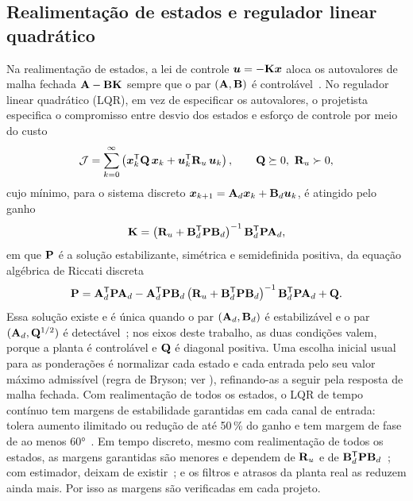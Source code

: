 \subsection{Realimentação de estados e regulador linear quadrático}

Na realimentação de estados, a lei de controle $\bm{u} = -\mathbf{K}\bm{x}$
aloca os autovalores de malha fechada $\mathbf{A} - \mathbf{B}\mathbf{K}$
sempre que o par $(\mathbf{A}, \mathbf{B})$ é
controlável~\cite{ogata2010,fadali2009}.
No regulador linear quadrático (LQR), em vez de especificar os autovalores, o
projetista especifica o compromisso entre desvio dos estados e esforço de
controle por meio do custo
\begin{equation}
\mathcal{J} = \sum_{k=0}^{\infty}
\left(\bm{x}_k^{\mathsf{T}}\mathbf{Q}\,\bm{x}_k
    + \bm{u}_k^{\mathsf{T}}\mathbf{R}_u\,\bm{u}_k\right),
\qquad \mathbf{Q} \succeq 0,\ \mathbf{R}_u \succ 0,
\label{eq:custo-lqr}
\end{equation}
cujo mínimo, para o sistema discreto
$\bm{x}_{k+1} = \mathbf{A}_d\bm{x}_k + \mathbf{B}_d\bm{u}_k$, é
atingido pelo ganho~\cite{franklin1998,datta2003}
\begin{equation}
\mathbf{K} = \left(\mathbf{R}_u + \mathbf{B}_d^{\mathsf{T}}\mathbf{P}\mathbf{B}_d\right)^{-1}
             \mathbf{B}_d^{\mathsf{T}}\mathbf{P}\mathbf{A}_d,
\label{eq:ganho-lqr}
\end{equation}
em que $\mathbf{P}$ é a solução estabilizante, simétrica e semidefinida
positiva, da equação algébrica de Riccati discreta
\begin{equation}
\mathbf{P} = \mathbf{A}_d^{\mathsf{T}}\mathbf{P}\mathbf{A}_d
 - \mathbf{A}_d^{\mathsf{T}}\mathbf{P}\mathbf{B}_d
   \left(\mathbf{R}_u + \mathbf{B}_d^{\mathsf{T}}\mathbf{P}\mathbf{B}_d\right)^{-1}
   \mathbf{B}_d^{\mathsf{T}}\mathbf{P}\mathbf{A}_d + \mathbf{Q}.
\label{eq:riccati}
\end{equation}
Essa solução existe e é única quando o par $(\mathbf{A}_d, \mathbf{B}_d)$ é
estabilizável e o par $(\mathbf{A}_d, \mathbf{Q}^{1/2})$ é
detectável~\cite{datta2003}; nos eixos deste trabalho, as duas condições
valem, porque a planta é controlável e $\mathbf{Q}$ é diagonal positiva. Uma
escolha inicial usual para as ponderações é normalizar cada estado e cada
entrada pelo seu valor máximo admissível (regra de Bryson; ver
), refinando-as a seguir pela resposta
de malha fechada. Com realimentação de todos os estados, o LQR de tempo
contínuo tem margens de estabilidade garantidas em cada canal de entrada:
tolera aumento ilimitado ou redução de até 50\,\% do ganho e tem margem de
fase de ao menos \ang{60}~\cite{safonov1977}. Em tempo discreto, mesmo com
realimentação de todos os estados, as margens garantidas são menores e
dependem de $\mathbf{R}_u$ e de $\mathbf{B}_d^{\mathsf{T}}\mathbf{P}\mathbf{B}_d$~\cite{shaked1986};
com estimador, deixam de existir~\cite{doyle1978}; e os filtros e atrasos da
planta real as reduzem ainda mais. Por isso as margens são verificadas em
cada projeto.


